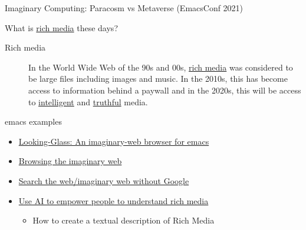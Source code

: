 \documentclass[presentation]{beamer}
\begin{document}
\begin{frame}[label={sec:org5cbc95e}]{Imaginary Computing: Paracosm vs Metaverse (EmacsConf 2021)}
\begin{block}{What is \uline{rich media} these days?}
\begin{description}
\item[{Rich media}] In the World Wide Web of the 90s and 00s, \uline{rich media}
was considered to be large files including
images and music. In the 2010s, this has become
access to information behind a paywall and in
the 2020s, this will be access to \uline{intelligent}
and \uline{truthful} media.
\end{description}
\end{block}

\begin{block}{emacs examples}
\begin{itemize}
\item \href{https://semiosis.github.io/looking-glass/}{Looking-Glass: An imaginary-web browser for emacs}
\item \href{https://mullikine.github.io/posts/the-imaginary-web-with-codex/}{Browsing the imaginary web}
\item \href{https://mullikine.github.io/posts/search-the-web-with-codex/}{Search the web/imaginary web without Google}
\item \href{https://mullikine.github.io/posts/alephalpha-for-alttext/}{Use AI to empower people to understand rich media}
\begin{itemize}
\item How to create a textual description of Rich Media
\end{itemize}
\end{itemize}
\end{block}
\end{frame}
\end{document}
